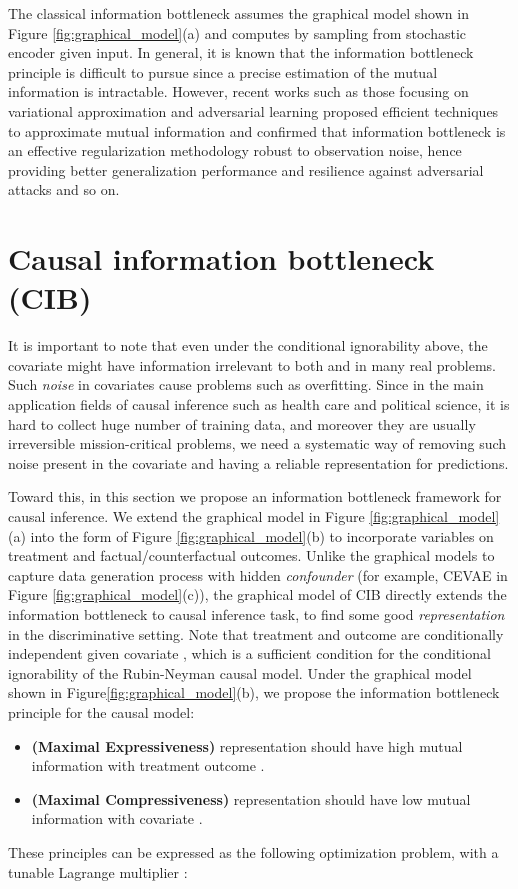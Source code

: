\documentclass{article}
\begin{document}
  The classical information bottleneck assumes the graphical model shown in Figure \ref{fig:graphical_model}(a) and computes  by sampling from stochastic encoder given input. In general, it is known that the information bottleneck principle is difficult to pursue since a precise estimation of the mutual information is intractable. However, recent works such as those focusing on variational approximation \cite{Alemi17} and adversarial learning \cite{Belghazi18} proposed efficient techniques to approximate mutual information and confirmed that information bottleneck is an effective regularization methodology robust to observation noise, hence providing better generalization performance and resilience against adversarial attacks and so on. 
  
\section{Causal information bottleneck (CIB)}
 It is important to note that even under the conditional ignorability above, the covariate  might have information irrelevant to both  and  in many real problems. Such \emph{noise} in covariates cause problems such as overfitting. Since in the main application fields of causal inference such as health care and political science, it is hard to collect huge number of training data, and moreover they are usually irreversible mission-critical problems, we need a systematic way of removing such noise present in the covariate and having a reliable representation for predictions.
    




Toward this, in this section we propose an information bottleneck framework for causal inference. We extend the graphical model in Figure \ref{fig:graphical_model}(a) into the form of Figure \ref{fig:graphical_model}(b) to incorporate variables on treatment and factual/counterfactual outcomes. Unlike the graphical models to capture data generation process with hidden \emph{confounder}  (for example, CEVAE \cite{Louizos17} in Figure \ref{fig:graphical_model}(c)), the graphical model of CIB directly extends the information bottleneck to causal inference task, to find some good \emph{representation} in the discriminative setting.
Note that treatment  and outcome  are conditionally independent given covariate , which is a sufficient condition for the conditional ignorability of the Rubin-Neyman causal model. Under the graphical model shown in Figure\ref{fig:graphical_model}(b), we propose the information bottleneck principle for the causal model:
    \begin{itemize}
        \item \textbf{(Maximal Expressiveness)} representation  should have high mutual information with treatment outcome .
        \item \textbf{(Maximal Compressiveness)} representation  should have low mutual information with covariate .
    \end{itemize}
    These principles can be expressed as the following optimization problem, with a tunable Lagrange multiplier :
    
\end{document}
